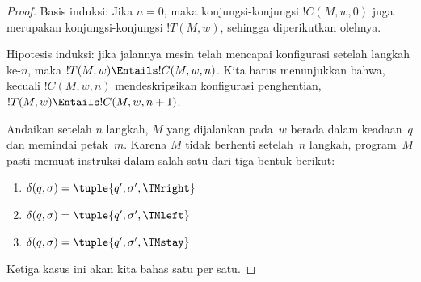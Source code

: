 \documentclass[../../../include/open-logic-section]{subfiles}
\begin{document}
\begin{proof}
Basis induksi: Jika $n = 0$, maka konjungsi-konjungsi $!C(M, w, 0)$ juga
merupakan konjungsi-konjungsi $!T(M, w)$, sehingga diperikutkan olehnya.

Hipotesis induksi: jika jalannya mesin telah mencapai konfigurasi setelah
langkah ke-$n$, maka $!T(M,w) \Entails !C(M, w, n)$. Kita harus menunjukkan
bahwa, kecuali $!C(M, w, n)$ mendeskripsikan konfigurasi penghentian,
$!T(M, w) \Entails !C(M, w, n+1)$.

Andaikan setelah $n$ langkah, $M$ yang dijalankan pada~$w$ berada dalam
keadaan~$q$ dan memindai petak~$m$. Karena $M$ tidak berhenti setelah~$n$
langkah, program~$M$ pasti memuat instruksi dalam salah satu dari tiga bentuk
berikut:

\begin{enumerate}
\item {} $\delta(q, \sigma) = \tuple{q', \sigma', \TMright}$

\item {} $\delta(q, \sigma) = \tuple{q', \sigma', \TMleft}$

\item {} $\delta(q, \sigma) = \tuple{q', \sigma', \TMstay}$
\end{enumerate}

Ketiga kasus ini akan kita bahas satu per satu.


\end{proof}
\end{document}

